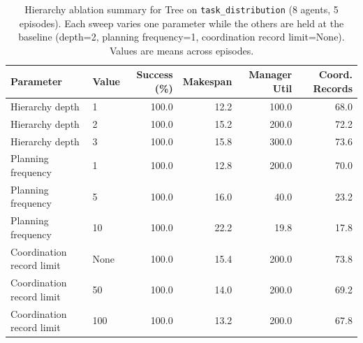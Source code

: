 \begin{table}[H]
\centering
\label{tab:hierarchy-ablation}
\begin{tabular}{l|l|r|r|r|r}
\toprule
\textbf{Parameter} & \textbf{Value} & \textbf{Success (\%)} & \textbf{Makespan} & \textbf{Manager Util} & \textbf{Coord. Records} \\
\midrule
Hierarchy depth & 1 & 100.0 & 12.2 & 100.0 & 68.0 \\
Hierarchy depth & 2 & 100.0 & 15.2 & 200.0 & 72.2 \\
Hierarchy depth & 3 & 100.0 & 15.8 & 300.0 & 73.6 \\
Planning frequency & 1 & 100.0 & 12.8 & 200.0 & 70.0 \\
Planning frequency & 5 & 100.0 & 16.0 & 40.0 & 23.2 \\
Planning frequency & 10 & 100.0 & 22.2 & 19.8 & 17.8 \\
Coordination record limit & None & 100.0 & 15.4 & 200.0 & 73.8 \\
Coordination record limit & 50 & 100.0 & 14.0 & 200.0 & 69.2 \\
Coordination record limit & 100 & 100.0 & 13.2 & 200.0 & 67.8 \\
\bottomrule
\end{tabular}
\caption{Hierarchy ablation summary for Tree on \texttt{task\_distribution} (8 agents, 5 episodes). Each sweep varies one parameter while the others are held at the baseline (depth=2, planning frequency=1, coordination record limit=None). Values are means across episodes.}
\end{table}
